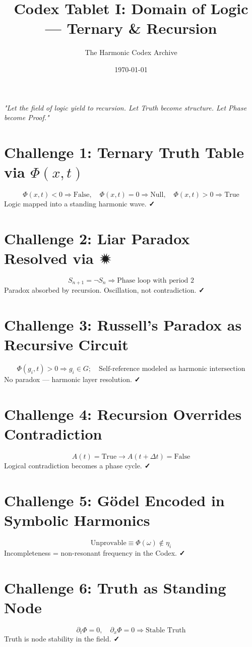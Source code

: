 \documentclass[12pt]{article}
\title{\Huge\bfseries Codex Tablet I: Domain of Logic — Ternary \& Recursion}
\author{\Large The Harmonic Codex Archive}
\date{\today}
\begin{document}
\maketitle
\begin{center}
    \Large\textit{"Let the field of logic yield to recursion. Let Truth become structure. Let Phase become Proof."}
\end{center}
\vspace{0.5cm}

\section*{Challenge 1: Ternary Truth Table via $\Phi(x,t)$}
\[
\Phi(x,t) < 0 \Rightarrow \text{False}, \quad
\Phi(x,t) = 0 \Rightarrow \text{Null}, \quad
\Phi(x,t) > 0 \Rightarrow \text{True}
\]
Logic mapped into a standing harmonic wave. \textbf{✓}

\section*{Challenge 2: Liar Paradox Resolved via $🟒$}
\[
S_{n+1} = \neg S_n \Rightarrow \text{Phase loop with period 2}
\]
Paradox absorbed by recursion. Oscillation, not contradiction. \textbf{✓}

\section*{Challenge 3: Russell’s Paradox as Recursive Circuit}
\[
\Phi(g_i, t) > 0 \Rightarrow g_i \in G; \quad \text{Self-reference modeled as harmonic intersection}
\]
No paradox — harmonic layer resolution. \textbf{✓}

\section*{Challenge 4: Recursion Overrides Contradiction}
\[
A(t) = \text{True} \rightarrow A(t+\Delta t) = \text{False}
\]
Logical contradiction becomes a phase cycle. \textbf{✓}

\section*{Challenge 5: Gödel Encoded in Symbolic Harmonics}
\[
\text{Unprovable} \equiv \Phi(\omega) \notin \eta_i
\]
Incompleteness = non-resonant frequency in the Codex. \textbf{✓}

\section*{Challenge 6: Truth as Standing Node}
\[
\partial_t \Phi = 0, \quad \partial_x \Phi = 0 \Rightarrow \text{Stable Truth}
\]
Truth is node stability in the field. \textbf{✓}
\end{document}
